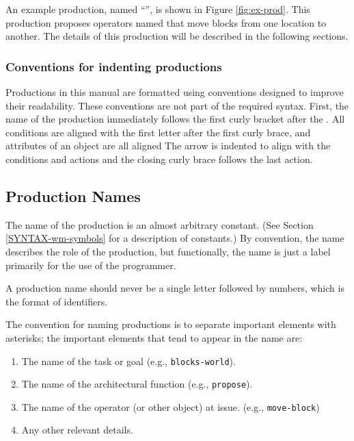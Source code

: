 An example production, named ``'', is
shown in Figure \ref{fig:ex-prod}. This production proposes operators named 
 that move blocks
from one location to another. The details of this production will be described
in the following sections.

\subsubsection*{Conventions for indenting productions}

Productions in this manual are formatted using conventions designed to
improve their readability. These conventions are not part of the
required syntax. First, the name of the production immediately follows
the first curly bracket after the .  All conditions are aligned
with the first letter after the first curly brace, and attributes of an
object are all aligned The arrow is indented to align with the
conditions and actions and the closing curly brace follows the last
action.

\subsection{Production Names}

The name of the production is  an almost arbitrary constant. (See Section
\ref{SYNTAX-wm-symbols} for a description of constants.) By convention, the
name describes the role of the production, but functionally, the name is
just a label primarily for the use of the programmer.  

A production name should never be a single letter followed by numbers, 
which is the format of identifiers.

The convention for naming productions is to separate important elements
with asterisks; the important elements that tend to appear in the name
are:\vspace{-12pt}
\begin{enumerate}
\item The name of the task or goal (e.g., \texttt{blocks-world}).\vspace{-10pt}
\item The name of the architectural function (e.g., \texttt{propose}).\vspace{-
10pt}
\item The name of the operator (or other object) at issue. (e.g.,
        \texttt{move-block})\vspace{-10pt} 
\item Any other relevant details.
\end{enumerate}


